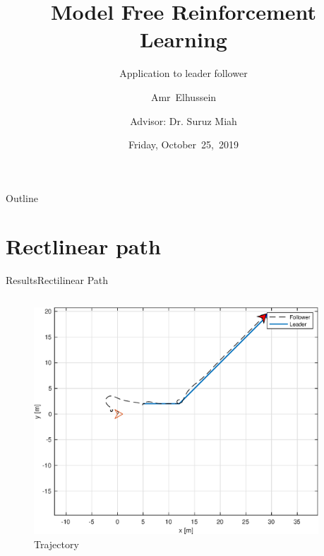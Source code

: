 \documentclass{beamer}
\title{Model Free Reinforcement Learning}
\subtitle{Application to leader follower}
\author[A.Elhussein]{Amr~Elhussein  \\\and
Advisor: Dr. Suruz Miah}
\institute[Bradley University] %
{
  Department of Electrical and Computer Engineering\\
  Bradley University\\
  1501 W. Bradley Avenue\\
  Peoria, IL, 61625, USA
}
\date[October~25,~2019]{Friday, October~25,~2019}
\begin{document}
\begin{frame}
  \titlepage
\end{frame}

\begin{frame}{Outline}
  \tableofcontents
\end{frame}


\section{Rectlinear path}
\begin{frame}{Results}{Rectilinear Path}
\begin{columns}
\begin{column}{0.5\textwidth}
\begin{figure}
\includegraphics[scale=0.35]{figs/matlab/gradientDescent/rectlinear/trajectoryRectilinear.eps}
\caption{Trajectory}
\end{figure}
\end{column}

\begin{column}{0.5\textwidth}
\begin{center}


\end{center}
\end{column}
\end{columns}
\end{frame}
\end{document}
